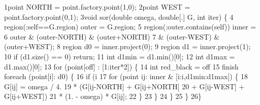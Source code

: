 \begin{tightcode}
\quad\num{1}point NORTH = point.factory.point(1,0);
\quad\num{2}point WEST  = point.factory.point(0,1);
\quad\num{3}void sor(double omega, double[.] G, int iter) \{
\quad\num{4}  region(:self==G.region) outer = G.region;
\quad\num{5}  region(:outer.contains(self)) inner =
\quad\num{6}    outer & (outer-NORTH) & (outer+NORTH)
\quad\num{7}          & (outer-WEST)  & (outer+WEST);
\quad\num{8}  region d0 = inner.project(0);
\quad\num{9}  region d1 = inner.project(1);
\quad\num{10}  if (d1.size() == 0) return;
\quad\num{11}  int d1min = d1.min()[0];
\quad\num{12}  int d1max = d1.max()[0];
\quad\num{13}  for (point[off] : [1:iter*2]) \{
\quad\num{14}    int red\_black = off %
\quad\num{15}    finish foreach (point[i]: d0) \{
\quad\num{16}      if (i %
\quad\num{17}        for (point ij: inner & [i:i,d1min:d1max]) \{
\quad\num{18}          G[ij] = omega / 4.
\quad\num{19}                * (G[ij-NORTH] + G[ij+NORTH]
\quad\num{20}                 + G[ij-WEST]  + G[ij+WEST])
\quad\num{21}                * (1. - omega) * G[ij];
\quad\num{22}        \}
\quad\num{23}      \}
\quad\num{24}    \}
\quad\num{25}  \}
\quad\num{26}\}
\end{tightcode}
